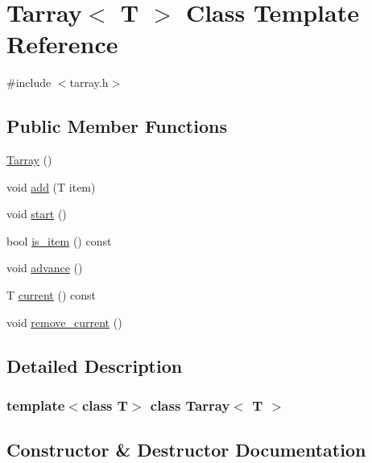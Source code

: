\hypertarget{class_tarray}{}\section{Tarray$<$ T $>$ Class Template Reference}
\label{class_tarray}


{\ttfamily \#include $<$tarray.\+h$>$}

\subsection*{Public Member Functions}
\begin{DoxyCompactItemize}
\item 
\hyperlink{class_tarray_a5181567a1f1a4d38092cd158258ba0f5}{Tarray} ()
\item 
void \hyperlink{class_tarray_a973a89fb0a3fe40c1680f6cae63981ad}{add} (T item)
\item 
void \hyperlink{class_tarray_afdf48d2a03b6b1c110818998b6a86a38}{start} ()
\item 
bool \hyperlink{class_tarray_ab4047d306cc681cee5b665f0cca887f1}{is\+\_\+item} () const
\item 
void \hyperlink{class_tarray_a5bd5dd08f5bfe1c2a5dab59ad7896ecf}{advance} ()
\item 
T \hyperlink{class_tarray_a60bc796c7843e2edaae82d42c15c4360}{current} () const
\item 
void \hyperlink{class_tarray_af1728e8ed47a8de0fd3eedfa526b0c43}{remove\+\_\+current} ()
\end{DoxyCompactItemize}


\subsection{Detailed Description}
\subsubsection*{template$<$class T$>$\newline
class Tarray$<$ T $>$}


\begin{DoxyCodeInclude}

\end{DoxyCodeInclude}
 
\begin{DoxyCodeInclude}
\end{DoxyCodeInclude}
 

\subsection{Constructor \& Destructor Documentation}
\hypertarget{class_tarray_a5181567a1f1a4d38092cd158258ba0f5}{}\label{class_tarray_a5181567a1f1a4d38092cd158258ba0f5} 
